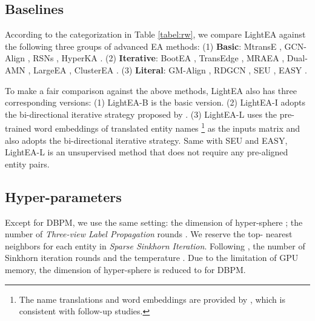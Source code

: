 \documentclass[11pt]{article}
\begin{document}
\subsection{Baselines}
According to the categorization in Table \ref{tabel:rw}, we compare LightEA against the following three groups of advanced EA methods:
(1) \textbf{Basic}:
MtransE \cite{DBLP:conf/ijcai/ChenTYZ17}, GCN-Align \cite{DBLP:conf/emnlp/WangLLZ18}, RSNs \cite{DBLP:conf/icml/GuoSH19}, HyperKA \cite{DBLP:conf/emnlp/SunCHWDZ20}.
(2) \textbf{Iterative}:
BootEA \cite{DBLP:conf/ijcai/SunHZQ18}, TransEdge \cite{DBLP:journals/corr/abs-2004-13579}, MRAEA \cite{DBLP:conf/wsdm/MaoWXLW20}, Dual-AMN \cite{DBLP:conf/www/MaoWWL21}, LargeEA \cite{DBLP:journals/pvldb/GeLCZG21}, ClusterEA \cite{DBLP:journals/corr/abs-2205-10312}.
(3) \textbf{Literal}:
GM-Align \cite{DBLP:conf/acl/XuWYFSWY19}, RDGCN \cite{DBLP:conf/ijcai/WuLF0Y019}, SEU \cite{DBLP:conf/emnlp/MaoWWL21}, EASY \cite{DBLP:conf/sigir/GeLCZG21}.

To make a fair comparison against the above methods, LightEA also has three corresponding versions:
(1) LightEA-B is the basic version.
(2) LightEA-I adopts the bi-directional iterative strategy proposed by \citet{DBLP:conf/wsdm/MaoWXLW20}.
(3) LightEA-L uses the pre-trained word embeddings of translated entity names \footnote{The name translations and word embeddings are provided by \citet{DBLP:conf/acl/XuWYFSWY19}, which is consistent with follow-up studies.} as the inputs matrix and also adopts the bi-directional iterative strategy.
Same with SEU and EASY, LightEA-L is an unsupervised method that does not require any pre-aligned entity pairs.

\subsection{Hyper-parameters}
\label{sec:hyper}
Except for DBPM, we use the same setting:
the dimension of hyper-sphere ;
the number of \emph{Three-view Label Propagation} rounds .
We reserve the top- nearest neighbors for each entity in \emph{Sparse Sinkhorn Iteration}.
Following \citet{DBLP:conf/emnlp/MaoWWL21}, the number of Sinkhorn iteration rounds  and the temperature .
Due to the limitation of GPU memory, the dimension of hyper-sphere  is reduced to  for DBPM.
\end{document}
